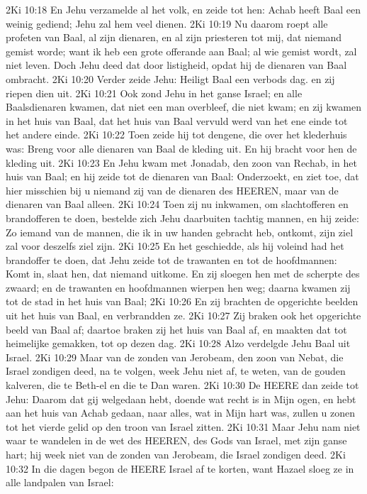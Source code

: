 2Ki 10:18  En Jehu verzamelde al het volk, en zeide tot hen: Achab heeft Baal een weinig gediend; Jehu zal hem veel dienen.
2Ki 10:19  Nu daarom roept alle profeten van Baal, al zijn dienaren, en al zijn priesteren tot mij, dat niemand gemist worde; want ik heb een grote offerande aan Baal; al wie gemist wordt, zal niet leven. Doch Jehu deed dat door listigheid, opdat hij de dienaren van Baal ombracht.
2Ki 10:20  Verder zeide Jehu: Heiligt Baal een verbods dag. en zij riepen dien uit.
2Ki 10:21  Ook zond Jehu in het ganse Israel; en alle Baalsdienaren kwamen, dat niet een man overbleef, die niet kwam; en zij kwamen in het huis van Baal, dat het huis van Baal vervuld werd van het ene einde tot het andere einde.
2Ki 10:22  Toen zeide hij tot dengene, die over het klederhuis was: Breng voor alle dienaren van Baal de kleding uit. En hij bracht voor hen de kleding uit.
2Ki 10:23  En Jehu kwam met Jonadab, den zoon van Rechab, in het huis van Baal; en hij zeide tot de dienaren van Baal: Onderzoekt, en ziet toe, dat hier misschien bij u niemand zij van de dienaren des HEEREN, maar van de dienaren van Baal alleen.
2Ki 10:24  Toen zij nu inkwamen, om slachtofferen en brandofferen te doen, bestelde zich Jehu daarbuiten tachtig mannen, en hij zeide: Zo iemand van de mannen, die ik in uw handen gebracht heb, ontkomt, zijn ziel zal voor deszelfs ziel zijn.
2Ki 10:25  En het geschiedde, als hij voleind had het brandoffer te doen, dat Jehu zeide tot de trawanten en tot de hoofdmannen: Komt in, slaat hen, dat niemand uitkome. En zij sloegen hen met de scherpte des zwaard; en de trawanten en hoofdmannen wierpen hen weg; daarna kwamen zij tot de stad in het huis van Baal;
2Ki 10:26  En zij brachten de opgerichte beelden uit het huis van Baal, en verbrandden ze.
2Ki 10:27  Zij braken ook het opgerichte beeld van Baal af; daartoe braken zij het huis van Baal af, en maakten dat tot heimelijke gemakken, tot op dezen dag.
2Ki 10:28  Alzo verdelgde Jehu Baal uit Israel.
2Ki 10:29  Maar van de zonden van Jerobeam, den zoon van Nebat, die Israel zondigen deed, na te volgen, week Jehu niet af, te weten, van de gouden kalveren, die te Beth-el en die te Dan waren.
2Ki 10:30  De HEERE dan zeide tot Jehu: Daarom dat gij welgedaan hebt, doende wat recht is in Mijn ogen, en hebt aan het huis van Achab gedaan, naar alles, wat in Mijn hart was, zullen u zonen tot het vierde gelid op den troon van Israel zitten.
2Ki 10:31  Maar Jehu nam niet waar te wandelen in de wet des HEEREN, des Gods van Israel, met zijn ganse hart; hij week niet van de zonden van Jerobeam, die Israel zondigen deed.
2Ki 10:32  In die dagen begon de HEERE Israel af te korten, want Hazael sloeg ze in alle landpalen van Israel:
